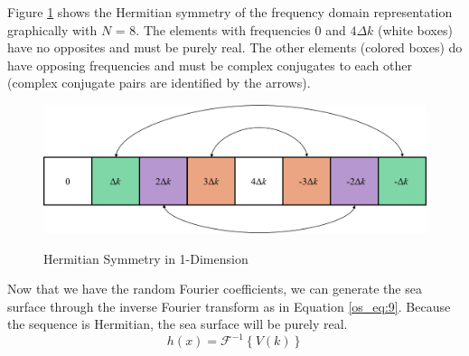 Figure \ref{os_fig:6ab} shows the Hermitian symmetry of the frequency domain representation graphically with $N$ = 8. The elements with frequencies $0$ and $4\Delta k$ (white boxes) have no opposites and must be purely real. The other elements (colored boxes) do have opposing frequencies and must be complex conjugates to each other (complex conjugate pairs are identified by the arrows).
\begin{figure}[H]
  \begin{center}
\includegraphics[width=5in]{../media/Ocean_Surface/1-d_hermitian_symmetry.png}
  \end{center}
  \renewcommand{\baselinestretch}{1} \small\normalsize
  \begin{quote}
    \caption[Hermitian Symmetry in 1-Dimension]{Hermitian Symmetry in 1-Dimension\label{os_fig:6ab}}
  \end{quote}
\end{figure}
\renewcommand{\baselinestretch}{2} \small\normalsize
Now that we have the random Fourier coefficients, we can generate the sea surface through the inverse Fourier transform as in Equation \ref{os_eq:9}. Because the sequence is Hermitian, the sea surface will be purely real.
\begin{equation}
  \label{os_eq:9}
  h(x) = \mathcal{F}^{-1}\left\{V(k) \right\}
  \end{equation}

